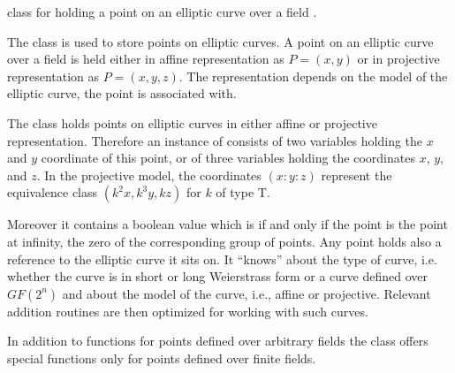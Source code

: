 
\def\ecp{point< T >}


\NAME

 \dotfill class for holding a point on an elliptic
curve over a field .



\ABSTRACT

The class  is used to store points on elliptic
curves.  A point on an elliptic curve over a field is held either in
affine representation as $P = (x, y)$ or in projective representation
as $P = (x, y, z)$.  The representation depends on the model of the
elliptic curve, the point is associated with.



\DESCRIPTION

The class  holds points on elliptic curves in either
affine or projective representation.  Therefore an instance of
 consists of two variables holding the $x$ and $y$
coordinate of this point, or of three variables holding the
coordinates $x$, $y$, and $z$.  In the projective model, the
coordinates $(x: y: z)$ represent the equivalence class $(k^{2} x,
k^{3} y, k z)$ for $k$ of type T.

Moreover it contains a boolean value which is \TRUE if and only if the
point is the point at infinity, the zero of the corresponding group of
points.  Any point holds also a reference to the elliptic curve it
sits on.  It ``knows'' about the type of curve, i.e. whether the curve
is in short or long Weierstrass form or a curve defined over $GF(2^n)$
and about the model of the curve, i.e., affine or projective.
Relevant addition routines are then optimized for working with such
curves.

In addition to functions for points defined over arbitrary fields the
class offers special functions only for points defined over finite
fields.



